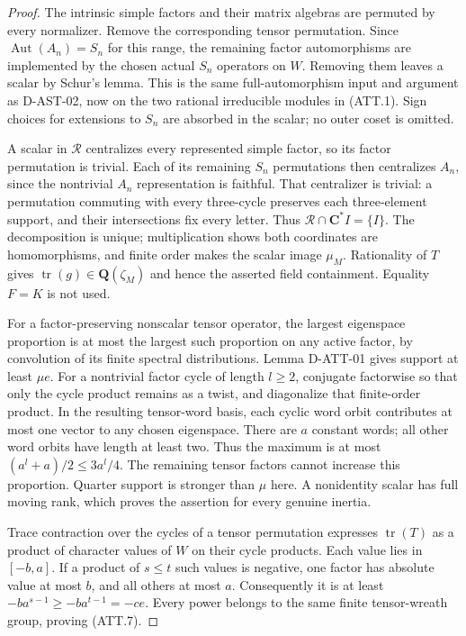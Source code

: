 \begin{proof}
The intrinsic simple factors and their matrix algebras are
permuted by every normalizer. Remove the corresponding tensor
permutation. Since $\operatorname{Aut}(A_n)=S_n$ for this range,
the remaining factor automorphisms are implemented by the
chosen actual $S_n$ operators on $W$. Removing them leaves a
scalar by Schur's lemma. This is the same full-automorphism
input and argument as D-AST-02, now on the two rational
irreducible modules in (ATT.1). Sign choices for extensions
to $S_n$ are absorbed in the scalar; no outer coset is omitted.

A scalar in $\mathcal R$ centralizes every represented simple
factor, so its factor permutation is trivial. Each of its
remaining $S_n$ permutations then centralizes $A_n$, since
the nontrivial $A_n$ representation is faithful. That
centralizer is trivial: a permutation commuting with every
three-cycle preserves each three-element support, and their
intersections fix every letter. Thus
$\mathcal R\cap\mathbf C^*I=\{I\}$. The decomposition is
unique; multiplication shows both coordinates are
homomorphisms, and finite order makes the scalar image
$\mu_M$. Rationality of $T$ gives
$\operatorname{tr}(g)\in\mathbf Q(\zeta_M)$ and hence the
asserted field containment. Equality $F=K$ is not used.

For a factor-preserving nonscalar tensor operator, the
largest eigenspace proportion is at most the largest such
proportion on any active factor, by convolution of its finite
spectral distributions. Lemma D-ATT-01 gives support at least
$\mu e$. For a nontrivial factor cycle of length $l\ge2$,
conjugate factorwise so that only the cycle product remains
as a twist, and diagonalize that finite-order product.
In the resulting tensor-word basis, each cyclic word orbit
contributes at most one vector to any chosen eigenspace.
There are $a$ constant words; all other word orbits have
length at least two. Thus the maximum is at most
$(a^l+a)/2\le3a^l/4$. The remaining tensor factors cannot
increase this proportion. Quarter support is stronger than
$\mu$ here. A nonidentity scalar has full moving rank,
which proves the assertion for every genuine inertia.

Trace contraction over the cycles of a tensor permutation
expresses $\operatorname{tr}(T)$ as a product of character
values of $W$ on their cycle products. Each value lies in
$[-b,a]$. If a product of $s\le t$ such values is negative,
one factor has absolute value at most $b$, and all others
at most $a$. Consequently it is at least
$-ba^{s-1}\ge-ba^{t-1}=-ce$. Every power belongs to the
same finite tensor-wreath group, proving (ATT.7).


\end{proof}
